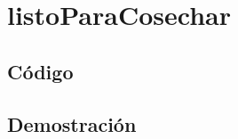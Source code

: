 \documentclass[a4paper]{article}
\begin{document}
\newpage

\section{listoParaCosechar}

    \subsection{C\'odigo}
    

    \subsection{Demostraci\'on}
        \noindent
       
\end{document}
